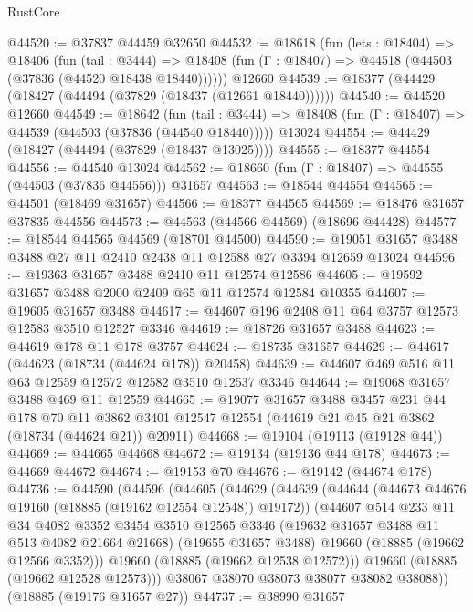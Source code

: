 \begin{lexlean}{RustCore}
\begin{coremodule}
@44520 := @37837 @44459 @32650
@44532 := @18618
    (fun (lets : @18404) =>
    @18406
      (fun (tail : @3444) =>
      @18408 (fun (Γ : @18407) => @44518 (@44503 (@37836 (@44520 @18438 @18440))))))
    @12660
@44539 := @18377 (@44429 (@18427 (@44494 (@37829 (@18437 (@12661 @18440))))))
@44540 := @44520 @12660
@44549 := @18642
    (fun (tail : @3444) => @18408 (fun (Γ : @18407) => @44539 (@44503 (@37836 (@44540 @18440)))))
    @13024
@44554 := @44429 (@18427 (@44494 (@37829 (@18437 @13025))))
@44555 := @18377 @44554
@44556 := @44540 @13024
@44562 := @18660 (fun (Γ : @18407) => @44555 (@44503 (@37836 @44556))) @31657
@44563 := @18544 @44554
@44565 := @44501 (@18469 @31657)
@44566 := @18377 @44565
@44569 := @18476 @31657 @37835 @44556
@44573 := @44563 (@44566 @44569) (@18696 @44428)
@44577 := @18544 @44565 @44569 (@18701 @44500)
@44590 := @19051 @31657 @3488 @3488 @27 @11 @2410 @2438 @11 @12588 @27 @3394 @12659 @13024
@44596 := @19363 @31657 @3488 @2410 @11 @12574 @12586
@44605 := @19592 @31657 @3488 @2000 @2409 @65 @11 @12574 @12584 @10355
@44607 := @19605 @31657 @3488
@44617 := @44607 @196 @2408 @11 @64 @3757 @12573 @12583 @3510 @12527 @3346
@44619 := @18726 @31657 @3488
@44623 := @44619 @178 @11 @178 @3757
@44624 := @18735 @31657
@44629 := @44617 (@44623 (@18734 (@44624 @178)) @20458)
@44639 := @44607 @469 @516 @11 @63 @12559 @12572 @12582 @3510 @12537 @3346
@44644 := @19068 @31657 @3488 @469 @11 @12559
@44665 := @19077
    @31657
    @3488
    @3457
    @231
    @44
    @178
    @70
    @11
    @3862
    @3401
    @12547
    @12554
    (@44619 @21 @45 @21 @3862 (@18734 (@44624 @21)) @20911)
@44668 := @19104 (@19113 (@19128 @44))
@44669 := @44665 @44668
@44672 := @19134 (@19136 @44 @178)
@44673 := @44669 @44672
@44674 := @19153 @70
@44676 := @19142 (@44674 @178)
@44736 := @44590
    (@44596
      (@44605
        (@44629
          (@44639
            (@44644 (@44673 @44676 @19160 (@18885 (@19162 @12554 @12548)) @19172))
            (@44607
              @514
              @233
              @11
              @34
              @4082
              @3352
              @3454
              @3510
              @12565
              @3346
              (@19632 @31657 @3488 @11 @513 @4082 @21664 @21668)
              (@19655 @31657 @3488)
              @19660
              (@18885 (@19662 @12566 @3352)))
            @19660
            (@18885 (@19662 @12538 @12572)))
          @19660
          (@18885 (@19662 @12528 @12573)))
        @38067
        @38070
        @38073
        @38077
        @38082
        @38088))
    (@18885 (@19176 @31657 @27))
@44737 := @38990 @31657

\end{coremodule}
\end{lexlean}
